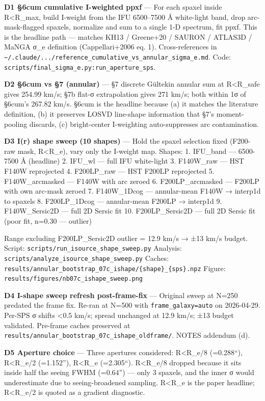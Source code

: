 \documentclass[
  10pt,
]{article}
\begin{document}
\textbf{D1 §6cum cumulative I-weighted ppxf} --- For each spaxel inside R\textless R\_max, build I-weight from the IFU 6500--7500 Å white-light band, drop arc-mask-flagged spaxels, normalize and sum
to a single 1-D spectrum, fit ppxf. This is the headline path --- matches KH13 / Greene+20 / SAURON / ATLAS3D / MaNGA σ\_e definition (Cappellari+2006 eq. 1). Cross-references in
\texttt{\textasciitilde{}/.claude/.../reference\_cumulative\_vs\_annular\_sigma\_e.md}. Code: \texttt{scripts/final\_sigma\_e.py:run\_aperture\_sps}.

\textbf{D2 §6cum vs §7 (annular)} --- §7 discrete Gültekin annular sum at R\textless R\_safe gives 254.99 km/s; §7b flat-σ extrapolation gives 271 km/s; both within 1σ of §6cum's 267.82 km/s. §6cum is
the headline because (a) it matches the literature definition, (b) it preserves LOSVD line-shape information that §7's moment-pooling discards, (c) bright-center I-weighting auto-suppresses arc
contamination.

\textbf{D3 I(r) shape sweep (10 shapes)} --- Hold the spaxel selection fixed (F200-raw mask, R\textless R\_e), vary only the I-weight map. Shapes: 1. IFU\_band --- 6500-7500 Å (headline) 2. IFU\_wl
--- full IFU white-light 3. F140W\_raw --- HST F140W reprojected 4. F200LP\_raw --- HST F200LP reprojected 5. F140W\_arcmasked --- F140W with arc zeroed 6. F200LP\_arcmasked --- F200LP with own
arc-mask zeroed 7. F140W\_1Dcog --- annular-mean F140W → interp1d to spaxels 8. F200LP\_1Dcog --- annular-mean F200LP → interp1d 9. F140W\_Sersic2D --- full 2D Sersic fit 10. F200LP\_Sersic2D --- full
2D Sersic fit (poor fit, n=0.30 --- outlier)

Range excluding F200LP\_Sersic2D outlier = 12.9 km/s → ±13 km/s budget. Script: \texttt{scripts/run\_isource\_shape\_sweep.py} Analysis: \texttt{scripts/analyze\_isource\_shape\_sweep.py} Caches:
\texttt{results/annular\_bootstrap\_07c\_ishape/\{shape\}\_\{sps\}.npz} Figure: \texttt{results/figures/nb07c\_ishape\_sweep.png}

\textbf{D4 I-shape sweep refresh post-frame-fix} --- Original sweep at N=250 predated the frame fix. Re-ran at N=500 with \texttt{frame\_galaxy=\textquotesingle{}auto\textquotesingle{}} on 2026-04-29.
Per-SPS σ shifts \textless0.5 km/s; spread unchanged at 12.9 km/s; ±13 budget validated. Pre-frame caches preserved at \texttt{results/annular\_bootstrap\_07c\_ishape\_oldframe/}. NOTES addendum (d).

\textbf{D5 Aperture choice} --- Three apertures considered: R\textless R\_e/8 (=0.288``), R\textless R\_e/2 (=1.152''), R\textless R\_e (=2.305``). R\textless R\_e/8 dropped because it sits inside
half the seeing FWHM (=0.64'') --- only 3 spaxels, and the inner σ would underestimate due to seeing-broadened sampling. R\textless R\_e is the paper headline; R\textless R\_e/2 is quoted as a
gradient diagnostic.
\end{document}
